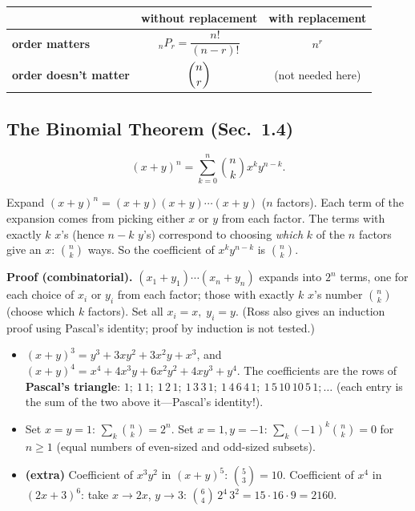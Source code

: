 \documentclass[11pt]{article}
\let\oldsubsection\subsection
\renewcommand{\subsection}{\Needspace{14\baselineskip}\oldsubsection}
\begin{document}
\begin{defbox}
\begin{center}
\renewcommand{\arraystretch}{1.3}
\begin{tabular}{@{}lcc@{}}
\toprule
& \textbf{without replacement} & \textbf{with replacement}\\
\midrule
\textbf{order matters} & ${}_nP_r=\dfrac{n!}{(n-r)!}$ & $n^r$\\
\textbf{order doesn't matter} & $\dbinom nr$ & (not needed here)\\
\bottomrule
\end{tabular}
\end{center}
\end{defbox}

\subsection{The Binomial Theorem (Sec.\ 1.4)}

\begin{thmbox}
\[ (x+y)^n=\sum_{k=0}^n\binom nk x^k y^{n-k}. \]
\end{thmbox}

\begin{ideabox}
Expand $(x+y)^n=(x+y)(x+y)\cdots(x+y)$ ($n$ factors). Each term of the expansion comes from picking either $x$ or $y$ from each factor. The terms with exactly $k$ $x$'s (hence $n-k$ $y$'s) correspond to choosing \emph{which} $k$ of the $n$ factors give an $x$: $\binom nk$ ways. So the coefficient of $x^ky^{n-k}$ is $\binom nk$.
\end{ideabox}

\textbf{Proof (combinatorial).} $(x_1+y_1)\cdots(x_n+y_n)$ expands into $2^n$ terms, one for each choice of $x_i$ or $y_i$ from each factor; those with exactly $k$ $x$'s number $\binom nk$ (choose which $k$ factors). Set all $x_i=x,\;y_i=y$. (Ross also gives an induction proof using Pascal's identity; proof by induction is not tested.)

\begin{exbox}
\begin{itemize}
\item $(x+y)^3=y^3+3xy^2+3x^2y+x^3$, and $(x+y)^4=x^4+4x^3y+6x^2y^2+4xy^3+y^4$. The coefficients are the rows of \textbf{Pascal's triangle}: $1;\ 1\,1;\ 1\,2\,1;\ 1\,3\,3\,1;\ 1\,4\,6\,4\,1;\ 1\,5\,10\,10\,5\,1;\dots$ (each entry is the sum of the two above it---Pascal's identity!).
\item Set $x=y=1$: $\sum_k\binom nk=2^n$. Set $x=1,y=-1$: $\sum_k(-1)^k\binom nk=0$ for $n\ge1$ (equal numbers of even-sized and odd-sized subsets).
\item \textbf{(extra)} Coefficient of $x^3y^2$ in $(x+y)^5$: $\binom53=10$. Coefficient of $x^4$ in $(2x+3)^6$: take $x\to2x$, $y\to3$: $\binom64\,2^4\,3^2=15\cdot16\cdot9=2160$.
\end{itemize}
\end{exbox}
\end{document}
